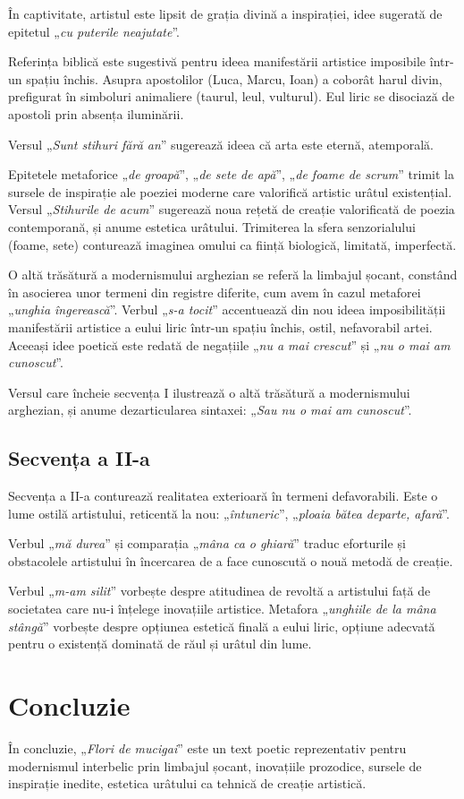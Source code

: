 \documentclass{article}
\newcommand{\qu}[1]{„\emph{#1}”}
\begin{document}
În captivitate, artistul este lipsit de grația divină a inspirației, idee sugerată de epitetul \qu{cu puterile neajutate}.

Referința biblică este sugestivă pentru ideea manifestării artistice imposibile într-un spațiu închis. Asupra apostolilor (Luca, Marcu, Ioan) a coborât harul divin, prefigurat în simboluri animaliere (taurul, leul, vulturul). Eul liric se disociază de apostoli prin absența iluminării.

Versul \qu{Sunt stihuri fără an} sugerează ideea că arta este eternă, atemporală.

Epitetele metaforice \qu{de groapă}, \qu{de sete de apă}, \qu{de foame de scrum} trimit la sursele de inspirație ale poeziei moderne care valorifică artistic urâtul existențial. Versul \qu{Stihurile de acum} sugerează noua rețetă de creație valorificată de poezia contemporană, și anume estetica urâtului. Trimiterea la sfera senzorialului (foame, sete) conturează imaginea omului ca ființă biologică, limitată, imperfectă.

O altă trăsătură a modernismului arghezian se referă la limbajul șocant, constând în asocierea unor termeni din registre diferite, cum avem în cazul metaforei \qu{unghia îngerească}. Verbul \qu{s-a tocit} accentuează din nou ideea imposibilității manifestării artistice a eului liric într-un spațiu închis, ostil, nefavorabil artei. Aceeași idee poetică este redată de negațiile \qu{nu a mai crescut} și \qu{nu o mai am cunoscut}.

Versul care încheie secvența I ilustrează o altă trăsătură a modernismului arghezian, și anume dezarticularea sintaxei: \qu{Sau nu o mai am cunoscut}.

\subsection{Secvența a II-a}
Secvența a II-a conturează realitatea exterioară în termeni defavorabili. Este o lume ostilă artistului, reticentă la nou: \qu{întuneric}, \qu{ploaia bătea departe, afară}.

Verbul \qu{mă durea} și comparația \qu{mâna ca o ghiară} traduc eforturile și obstacolele artistului în încercarea de a face cunoscută o nouă metodă de creație.

Verbul \qu{m-am silit} vorbește despre atitudinea de revoltă a artistului față de societatea care nu-i înțelege inovațiile artistice. Metafora \qu{unghiile de la mâna stângă} vorbește despre opțiunea estetică finală a eului liric, opțiune adecvată pentru o existență dominată de răul și urâtul din lume.

\section{Concluzie}
În concluzie, \qu{Flori de mucigai} este un text poetic reprezentativ pentru modernismul interbelic prin limbajul șocant, inovațiile prozodice, sursele de inspirație inedite, estetica urâtului ca tehnică de creație artistică.
\end{document}
